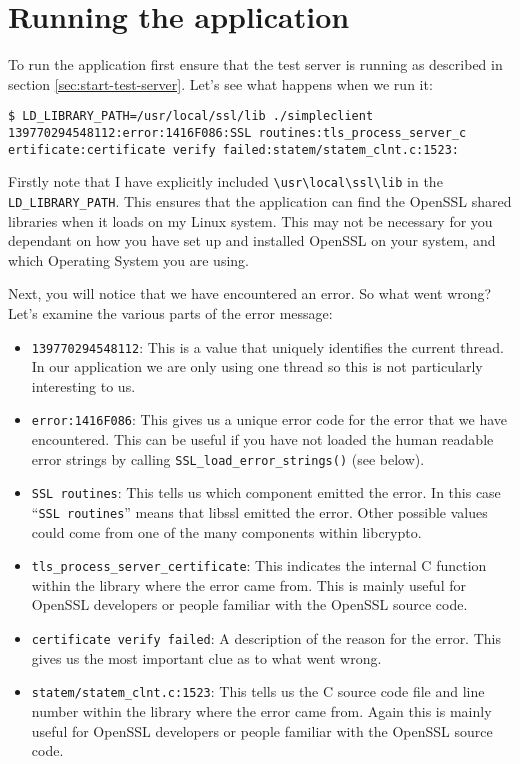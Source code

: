 \section {Running the application}

To run the application first ensure that the test server is running as 
described in section \ref{sec:start-test-server}. Let's see what happens when 
we run it:

\begin{verbatim}
$ LD_LIBRARY_PATH=/usr/local/ssl/lib ./simpleclient
139770294548112:error:1416F086:SSL routines:tls_process_server_c
ertificate:certificate verify failed:statem/statem_clnt.c:1523:
\end{verbatim}

Firstly note that I have explicitly included \verb!\usr\local\ssl\lib! in the 
\verb!LD_LIBRARY_PATH!. This ensures that the application can find the OpenSSL 
shared libraries when it loads on my Linux system. This may not be necessary for
you dependant on how you have set up and installed OpenSSL on your system, and 
which Operating System you are using.

Next, you will notice that we have encountered an error. So what went wrong? 
Let's examine the various parts of the error message:
\begin{itemize}
\item \texttt{139770294548112}: This is a value that uniquely identifies the
current thread. In our application we are only using one thread so this is not 
particularly interesting to us.
\item \texttt{error:1416F086}: This gives us a unique error code for the error
that we have encountered. This can be useful if you have not loaded the human
readable error strings by calling \texttt{SSL\_load\_error\_strings()} (see
below).
\item \texttt{SSL routines}: This tells us which component emitted the error. In
this case ``\texttt{SSL routines}'' means that libssl emitted the error. Other
possible values could come from one of the many components within libcrypto.
\item \texttt{tls\_process\_server\_certificate}: This indicates the internal C
function within the library where the error came from. This is mainly useful for
OpenSSL developers or people familiar with the OpenSSL source code.
\item \texttt{certificate verify failed}: A description of the reason for the
error. This gives us the most important clue as to what went wrong.
\item \texttt{statem/statem\_clnt.c:1523}: This tells us the C source code file 
and line number within the library where the error came from. Again this is
mainly  useful for OpenSSL developers or people familiar with the OpenSSL
source code.
\end{itemize}

